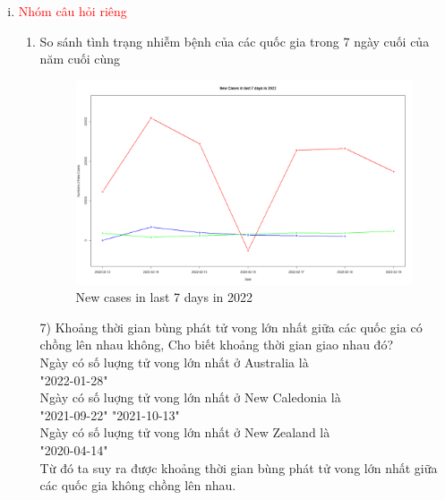 \documentclass[a4paper]{article}
\theoremstyle{definition}
\begin{document}
\begin{enumerate}[i)]
\begin{enumerate}[1)]
\end{enumerate}

\item \textcolor{red}{Nhóm câu hỏi riêng}
\begin{enumerate}[1)]
\item So sánh tình trạng nhiễm bệnh của các quốc gia trong 7 ngày cuối của năm cuối cùng 
 \begin{figure}[h]
    \centering
   \includegraphics[scale=0.3]{Images/Rplot01.png}
   \caption{New cases in last 7 days in 2022}
\end{figure}


\item[7)]  Khoảng thời gian bùng phát tử vong lớn nhất giữa các quốc gia có chồng lên nhau không, Cho biết khoảng thời gian giao nhau đó?\\
Ngày có số luợng tử vong lớn nhất ở Australia là \\
[1] "2022-01-28" \\
Ngày có số luợng tử vong lớn nhất ở New Caledonia là \\
[1] "2021-09-22" "2021-10-13" \\
Ngày có số luợng tử vong lớn nhất ở New Zealand là \\
[1] "2020-04-14" \\
Từ đó ta suy ra được khoảng thời gian bùng phát tử vong lớn nhất giữa các quốc gia không chồng lên nhau.


\end{enumerate}
\end{enumerate}
\end{document}
